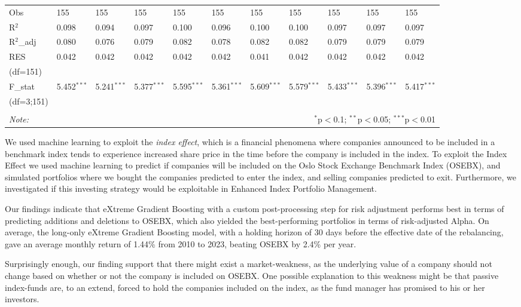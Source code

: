 \begin{table}[H]
\begin{tabularx}{\textwidth}{XXXXXXXXXXl}
Obs & 155 & 155 & 155 & 155 & 155 & 155 & 155 & 155 & 155 & 155 \\ 
R$^{2}$ & 0.098 & 0.094 & 0.097 & 0.100 & 0.096 & 0.100 & 0.100 & 0.097 & 0.097 & 0.097 \\ 
R$^{2}$_{adj} & 0.080 & 0.076 & 0.079 & 0.082 & 0.078 & 0.082 & 0.082 & 0.079 & 0.079 & 0.079 \\ 
RES & 0.042 & 0.042 & 0.042 & 0.042 & 0.042 & 0.041 & 0.042 & 0.042 & 0.042 & 0.042 \\ 
(df=151) & & & & & & & & & & \\
F_{stat} & 5.452$^{***}$ & 5.241$^{***}$ & 5.377$^{***}$ & 5.595$^{***}$ & 5.361$^{***}$ & 5.609$^{***}$ & 5.579$^{***}$ & 5.433$^{***}$ & 5.396$^{***}$ & 5.417$^{***}$ \\
(df=3;151) & & & & & & & & & & \\
\hline 
\hline \\[-1.8ex] 
\textit{Note:}  & \multicolumn{10}{r}{$^{*}$p$<$0.1; $^{**}$p$<$0.05; $^{***}$p$<$0.01} \\ 
\end{tabularx} 
\end{table} 



We used machine learning to exploit the \textit{index effect}, which is a financial phenomena where companies announced to be included in a benchmark index tends to experience increased share price in the time before the company is included in the index. To exploit the Index Effect we used machine learning to predict if companies will be included on the Oslo Stock Exchange Benchmark Index (OSEBX), and simulated portfolios where we bought the companies predicted to enter the index, and selling companies predicted to exit. Furthermore, we investigated if this investing strategy would be exploitable in Enhanced Index Portfolio Management.

Our findings indicate that eXtreme Gradient Boosting with a custom post-processing step for risk adjustment performs best in terms of predicting additions and deletions to OSEBX, which also yielded the best-performing portfolios in terms of risk-adjusted Alpha. On average, the long-only eXtreme Gradient Boosting model, with a holding horizon of 30 days before the effective date of the rebalancing, gave an average monthly return of 1.44\% from 2010 to 2023, beating OSEBX by 2.4\% per year.

Surprisingly enough, our finding support that there might exist a market-weakness, as the underlying value of a company should not change based on whether or not the company is included on OSEBX. One possible explanation to this weakness might be that passive index-funds are, to an extend, forced to hold the companies included on the index, as the fund manager has promised to his or her investors.




